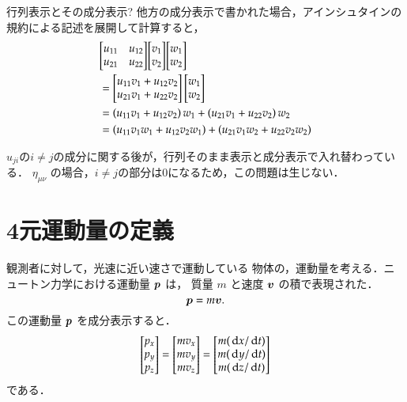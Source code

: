 \begin{memo}{行列表示とその成分表示?}
        他方の成分表示で書かれた場合，アインシュタインの規約による記述を展開して計算すると，
        \begin{align*}
            &\mqty[ \xmat*{u}{2}{2} ]
             \mqty[ \xmat*{v}{2}{1} ]
             \mqty[ \xmat*{w}{2}{1} ] \\
            &=
            \begin{bmatrix}
                {u}_{11} {v}_{1} + {u}_{12} {v}_{2} \\
                {u}_{21} {v}_{1} + {u}_{22} {v}_{2}
            \end{bmatrix}
            \mqty[ \xmat*{w}{2}{1} ] \\
            &=
            \left(
              {u}_{11} {v}_{1} + {u}_{12} {v}_{2}
            \right) {w}_{1}
            +
            \left(
              {u}_{21} {v}_{1} + {u}_{22} {v}_{2}
            \right) {w}_{2} \\
            &= \left(
              {u}_{11} {v}_{1} {w}_{1} + {u}_{12} {v}_{2} {w}_{1}
            \right)
             +
            \left(
              {u}_{21} {v}_{1} {w}_{2} + {u}_{22} {v}_{2} {w}_{2}
            \right)
        \end{align*}

        $u_{ji}$の$i \ne j$の成分に関する後が，行列そのまま表示と成分表示で入れ替わっている．
        $\eta_{\mu\nu}$ の場合，$i \ne j$の部分は0になるため，この問題は生じない．
    \end{memo}

\section{4元運動量の定義}
    観測者に対して，光速に近い速さで運動している
    物体の，運動量を考える．ニュートン力学における運動量 $\boldsymbol{p}$ は，
    質量 $m$ と速度 $\boldsymbol{v}$ の積で表現された．
        \begin{equation*}
            \boldsymbol{p} = m \boldsymbol{v}.
        \end{equation*}
    この運動量 $\boldsymbol{p}$ を成分表示すると．
        \begin{align*}
            \begin{bmatrix}
                p_{x} \\
                p_{y} \\
                p_{z}
            \end{bmatrix}
            =
            \begin{bmatrix}
            mv_{x} \\
            mv_{y} \\
            mv_{z}
            \end{bmatrix}
            =
            \begin{bmatrix}
                m(\,\mathrm{d} x/\,\mathrm{d} t) \\
                m(\,\mathrm{d} y/\,\mathrm{d} t) \\
                m(\,\mathrm{d} z/\,\mathrm{d} t)
            \end{bmatrix}
        \end{align*}
    である．

